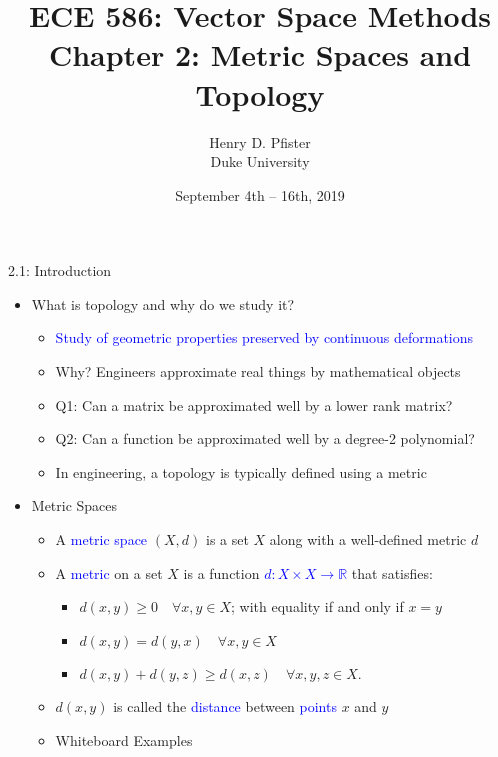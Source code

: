 \documentclass[10pt,english]{beamer}
\newif\ifslow
\begin{document}
\ifslow

\title{ECE 586: Vector Space Methods \\ Chapter 2: Metric Spaces and Topology}
\author{Henry D. Pfister \\ Duke University}
\date{September 4th -- 16th, 2019}
\maketitle

\begin{frame}{2.1: Introduction}

\begin{itemize}
\setlength\itemsep{3mm}
\item<1-> What is topology and why do we study it? \vspace{1mm}
\begin{itemize} 
  \setlength\itemsep{1.5mm}
  \item<1-> \textcolor{blue}{Study of geometric properties preserved by continuous deformations}
  \item<2-> Why? Engineers approximate real things by mathematical objects
  \item<2-> Q1: Can a matrix be approximated well by a lower rank matrix?
  \item<2-> Q2: Can a function be approximated well by a degree-2 polynomial?
  \item<2-> In engineering, a topology is typically defined using a metric
\end{itemize}

\vspace{1mm}

\item<3-> Metric Spaces \vspace{1mm}
\begin{itemize} 
  \setlength\itemsep{1.5mm}
  \item A \textcolor{blue}{metric space} $(X,d)$ is a set $X$ along with a well-defined metric $d$
  \item A \textcolor{blue}{metric} on a set $X$ is a function \textcolor{blue}{$d \colon X \times X \rightarrow \mathbb{R} $} that satisfies: \vspace{1mm}
  \begin{itemize}
  \setlength\itemsep{1.5mm}
  \item $d(x,y) \geq 0 \quad \forall x, y \in X$; with equality if and only if $x = y$
  \item $d(x,y) = d(y,x) \quad \forall x, y \in X$
  \item $d(x,y) + d(y,z) \geq d(x,z) \quad \forall x, y, z \in X$.
  \end{itemize}
  \item $d(x,y)$ is called the \textcolor{blue}{distance} between \textcolor{blue}{points} $x$ and $y$
  \item Whiteboard Examples
\end{itemize}
\end{itemize}
\end{frame}
\end{document}
